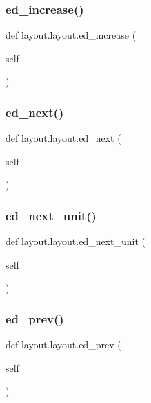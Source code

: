 \subsubsection{\texorpdfstring{ed\+\_\+increase()}{ed\_increase()}}
{\footnotesize\ttfamily def layout.\+layout.\+ed\+\_\+increase (\begin{DoxyParamCaption}\item[{}]{self }\end{DoxyParamCaption})}

\mbox{\label{classlayout_1_1layout_a15504939ad10f87020d0910fd7374bed}} 
\subsubsection{\texorpdfstring{ed\+\_\+next()}{ed\_next()}}
{\footnotesize\ttfamily def layout.\+layout.\+ed\+\_\+next (\begin{DoxyParamCaption}\item[{}]{self }\end{DoxyParamCaption})}

\mbox{\label{classlayout_1_1layout_ae0141cdca0be7dd22e9da7b2464cc317}} 
\subsubsection{\texorpdfstring{ed\+\_\+next\+\_\+unit()}{ed\_next\_unit()}}
{\footnotesize\ttfamily def layout.\+layout.\+ed\+\_\+next\+\_\+unit (\begin{DoxyParamCaption}\item[{}]{self }\end{DoxyParamCaption})}

\mbox{\label{classlayout_1_1layout_a806ed3d52003228e1c7bcc0047287040}} 
\subsubsection{\texorpdfstring{ed\+\_\+prev()}{ed\_prev()}}
{\footnotesize\ttfamily def layout.\+layout.\+ed\+\_\+prev (\begin{DoxyParamCaption}\item[{}]{self }\end{DoxyParamCaption})}

